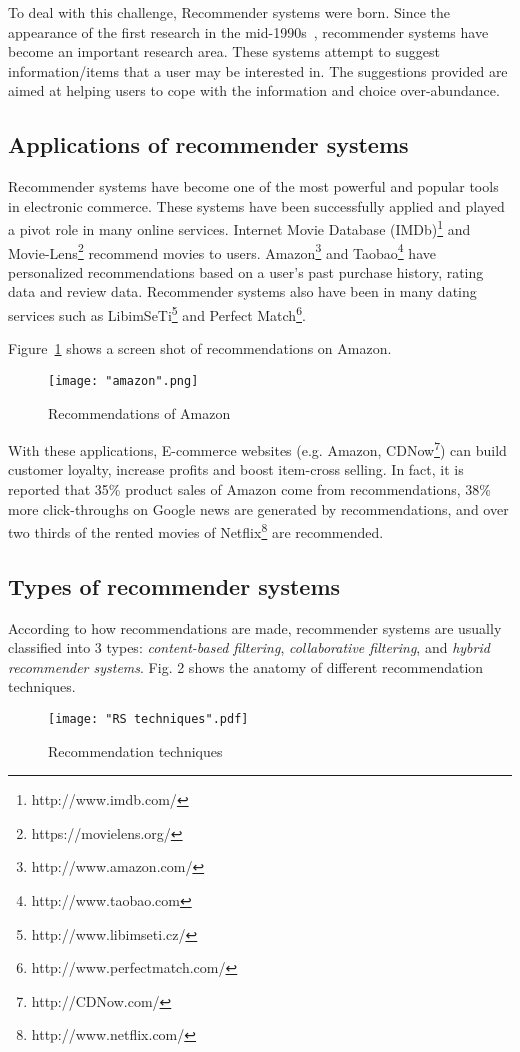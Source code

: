 \documentclass[oneside,13pt]{extreport}
\begin{document}
To deal with this challenge, Recommender systems were born. Since the appearance of the first research in the mid-1990s~\cite{Hill, Resnick, Shardanand}, recommender systems have become an important research area. These systems attempt to suggest information/items that a user may be interested in. The suggestions provided are aimed at helping users to cope with the information and choice over-abundance. 

\subsection{Applications of recommender systems}
Recommender systems have become one of the most powerful and popular tools in electronic commerce. These systems have been successfully applied and played a pivot role in many online services.  Internet Movie Database (IMDb)\footnote{http://www.imdb.com/} and Movie-Lens\footnote{https://movielens.org/} recommend movies to users. Amazon\footnote{http://www.amazon.com/} and Taobao\footnote{http://www.taobao.com} have personalized recommendations based on a user’s past purchase history, rating data and review data. Recommender systems also have been  in many dating services such as LibimSeTi\footnote{http://www.libimseti.cz/} and Perfect Match\footnote{http://www.perfectmatch.com/}.

Figure~\ref{fig:amazon} shows a screen shot of recommendations on Amazon.
\clearpage
\begin{figure}[h!]
    \centering
    \texttt{[image: "amazon".png]} 
    \caption{Recommendations of Amazon}
    \label{fig:amazon}
\end{figure}


With these applications, E-commerce websites (e.g. Amazon, CDNow\footnote{http://CDNow.com/}) can build customer loyalty, increase profits and boost item-cross selling. In fact, it is reported that 35\% product sales of Amazon come from recommendations, 38\% more click-throughs on Google news are generated by recommendations, and over two thirds of the rented movies of Netflix\footnote{http://www.netflix.com/} are recommended\cite{Chevalier}.


\subsection{Types of recommender systems}
According to how recommendations are made, recommender systems are usually classified into 3 types\cite{Adomavicius, Balabanovic}: \emph{content-based filtering}, \emph{collaborative filtering}, and \emph{hybrid recommender systems}. Fig. 2 shows the anatomy of different recommendation techniques.
\clearpage
\begin{figure}[h!]
\centering
\texttt{[image: "RS techniques".pdf]}
\caption{Recommendation techniques}
\label{fig:RS_techniques}
\end{figure}
\end{document}
